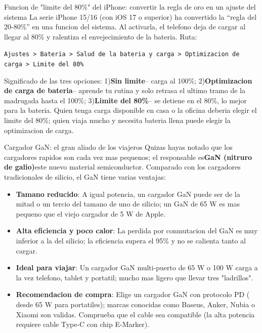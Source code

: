 \begin{tcbinfo}{Funcion de "limite del 80\%" del iPhone: convertir la regla de oro en un ajuste del sistema}
La serie iPhone 15/16 (con iOS 17 o superior) ha convertido la “regla del 20-80\%” en una funcion del sistema. Al activarla, el telefono deja de cargar al llegar al 80\% y ralentiza el envejecimiento de la bateria. Ruta:

\texttt{Ajustes > Bateria > Salud de la bateria y carga > Optimizacion de carga > Limite del 80\%}

Significado de las tres opciones: 1)\textbf{Sin limite}-- carga al 100\%; 2)\textbf{Optimizacion de carga de bateria}-- aprende tu rutina y solo retrasa el ultimo tramo de la madrugada hasta el 100\%; 3)\textbf{Limite del 80\%}-- se detiene en el 80\%, lo mejor para la bateria. Quien tenga carga disponible en casa o la oficina deberia elegir el limite del 80\%; quien viaja mucho y necesita bateria llena puede elegir la optimizacion de carga.

\end{tcbinfo}

\begin{tcbinfo}{Cargador GaN: el gran aliado de los viajeros}
Quizas hayas notado que los cargadores rapidos son cada vez mas pequenos; el responsable es\textbf{GaN (nitruro de galio)}este nuevo material semiconductor. Comparado con los cargadores tradicionales de silicio, el GaN tiene varias ventajas:

\begin{itemize}
  \item \textbf{Tamano reducido}: A igual potencia, un cargador GaN puede ser de la mitad o un tercio del tamano de uno de silicio; un GaN de 65 W es mas pequeno que el viejo cargador de 5 W de Apple.
  \item \textbf{Alta eficiencia y poco calor}: La perdida por conmutacion del GaN es muy inferior a la del silicio; la eficiencia supera el 95\% y no se calienta tanto al cargar.
  \item \textbf{Ideal para viajar}: Un cargador GaN multi-puerto de 65 W o 100 W carga a la vez telefono, tablet y portatil; mucho mas ligero que llevar tres "ladrillos".
  \item \textbf{Recomendacion de compra}: Elige un cargador GaN con protocolo PD ( desde 65 W para portatiles); marcas conocidas como Baseus, Anker, Nubia o Xiaomi son validas. Comprueba que el cable sea compatible (la alta potencia requiere cable Type-C con chip E-Marker).
\end{itemize}

\end{tcbinfo}

